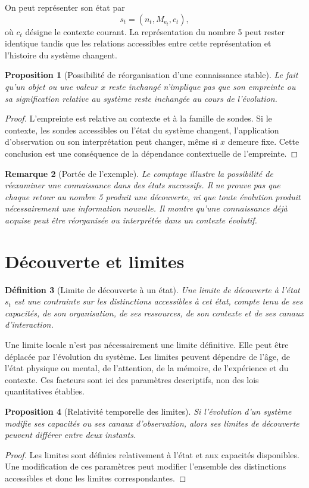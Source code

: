 \documentclass[11pt,a4paper,openany]{book}
\newtheorem{definition}{Définition}[chapter]
\newtheorem{proposition}[definition]{Proposition}
\newtheorem{remark}[definition]{Remarque}
\newcommand{\Mevo}{M_{\mathrm{e}}}
\begin{document}
On peut représenter son état par
\[
s_t=(n_t,\Mevo_t,c_t),
\]
où $c_t$ désigne le contexte courant. La représentation du nombre 5 peut rester identique tandis que les relations accessibles entre cette représentation et l'histoire du système changent.

\begin{proposition}[Possibilité de réorganisation d'une connaissance stable]
Le fait qu'un objet ou une valeur $x$ reste inchangé n'implique pas que son empreinte ou sa signification relative au système reste inchangée au cours de l'évolution.
\end{proposition}
\begin{proof}
L'empreinte est relative au contexte et à la famille de sondes. Si le contexte, les sondes accessibles ou l'état du système changent, l'application d'observation ou son interprétation peut changer, même si $x$ demeure fixe. Cette conclusion est une conséquence de la dépendance contextuelle de l'empreinte.\end{proof}

\begin{remark}[Portée de l'exemple]
Le comptage illustre la possibilité de réexaminer une connaissance dans des états successifs. Il ne prouve pas que chaque retour au nombre 5 produit une découverte, ni que toute évolution produit nécessairement une information nouvelle. Il montre qu'une connaissance déjà acquise peut être réorganisée ou interprétée dans un contexte évolutif.
\end{remark}

\section{Découverte et limites}
\begin{definition}[Limite de découverte à un état]
Une limite de découverte à l'état $s_t$ est une contrainte sur les distinctions accessibles à cet état, compte tenu de ses capacités, de son organisation, de ses ressources, de son contexte et de ses canaux d'interaction.
\end{definition}

Une limite locale n'est pas nécessairement une limite définitive. Elle peut être déplacée par l'évolution du système. Les limites peuvent dépendre de l'âge, de l'état physique ou mental, de l'attention, de la mémoire, de l'expérience et du contexte. Ces facteurs sont ici des paramètres descriptifs, non des lois quantitatives établies.

\begin{proposition}[Relativité temporelle des limites]
Si l'évolution d'un système modifie ses capacités ou ses canaux d'observation, alors ses limites de découverte peuvent différer entre deux instants.
\end{proposition}
\begin{proof}
Les limites sont définies relativement à l'état et aux capacités disponibles. Une modification de ces paramètres peut modifier l'ensemble des distinctions accessibles et donc les limites correspondantes.\end{proof}
\end{document}
